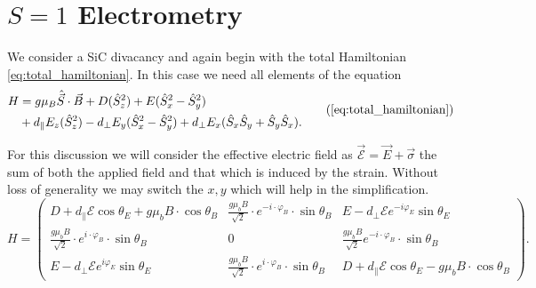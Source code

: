 \section{$S = 1$ Electrometry}

We consider a SiC divacancy and again begin with the total Hamiltonian \eqref{eq:total_hamiltonian}. In this case we need all elements of the equation
\begin{equation}
	\begin{align}
		H & = g \mu_B \hat{\vec{S}}\cdot \vec{B} +
		D(\hat{S}_z^2)  + E(\hat{S}_x^2 - \hat{S}_y^2) \\
		  & +d_\parallel E_z (\hat{S}_z^2)
		- d_\perp  E_y(\hat{S}_x^2 - \hat{S}_y^2   ) + d_\perp E_x(\hat{S}_x\hat{S}_y + \hat{S}_y\hat{S}_x).
	\end{align}
	\tag{\ref{eq:total_hamiltonian}}
\end{equation}

For this discussion we will consider the effective electric field as  $\vec{\mathcal{E}} = \vec{E} + \vec{\sigma} $ the sum of both the applied field and that which is induced by the strain.
Without loss of generality we may switch the $x, y$ which will help in the simplification.
\begin{equation}
	H = \begin{pmatrix}
		D + d_\parallel \mathcal{E}\cos\theta_E + g\mu_b B \cdot \cos \theta_B   & \frac{g\mu_b B}{\sqrt{2}} \cdot e^{-i\cdot \varphi_B} \cdot \sin\theta_B & E - d_\perp \mathcal{E} e^{-i \varphi_E}\sin\theta_E                  \\
		\frac{g\mu_b B}{\sqrt{2}} \cdot e^{i \cdot \varphi_B} \cdot \sin\theta_B & 0                                                                        & \frac{g\mu_b B}{\sqrt{2}} e^{-i\cdot \varphi_B} \cdot \sin\theta_B    \\
		E - d_\perp\mathcal{E}e^{i \varphi_E}\sin\theta_E                        & \frac{g\mu_b B}{\sqrt{2}} \cdot e^{i \cdot \varphi_B} \cdot \sin\theta_B & D+ d_\parallel \mathcal{E}\cos\theta_E - g\mu_b B \cdot \cos \theta_B
	\end{pmatrix}.
	\label{eq:}
\end{equation}

